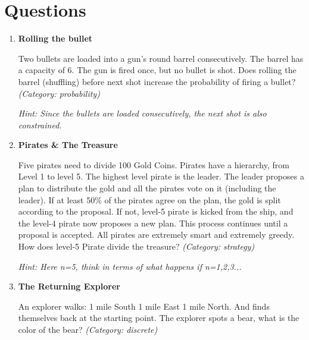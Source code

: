 \section{Questions}
\begin{enumerate}

\item \textbf{Rolling the bullet}

Two bullets are loaded into a gun's round barrel consecutively. The barrel has a capacity of 6. The gun is fired once, but no bullet is shot. Does rolling the barrel (shuffling) before next shot increase the probability of firing a bullet?
\small\emph{(Category: probability)}

\small\emph{Hint: Since the bullets are loaded consecutively, the next shot is also constrained.}





\item \textbf{Pirates \& The Treasure}

Five pirates need to divide 100 Gold Coins. Pirates have a hierarchy, from Level 1 to level 5. The highest level pirate is the leader. The leader proposes a plan to distribute the gold and all the pirates vote on it (including the leader). If at least 50\% of the pirates agree on the plan, the gold is split according to the proposal. If not, level-5 pirate is kicked from the ship, and the level-4 pirate now proposes a new plan. This process continues until a proposal is accepted. All pirates are extremely smart and extremely greedy. How does level-5 Pirate divide the treasure?
\small\emph{(Category: strategy)}

\small\emph{Hint: Here n=5, think in terms of what happens if n=1,2,3...}





\item \textbf{The Returning Explorer}

An explorer walks:
1 mile South
1 mile East
1 mile North.
And finds themselves back at the starting point. The explorer spots a bear, what is the color of the bear?
\small\emph{(Category: discrete)}


\end{enumerate}
